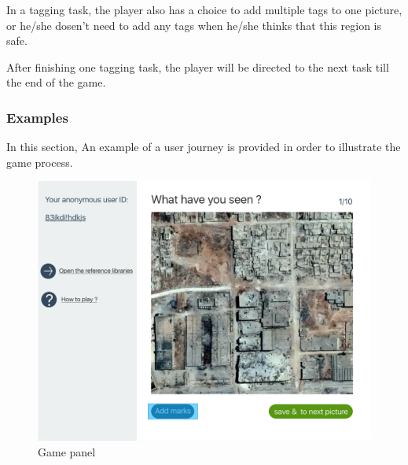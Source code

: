       In a tagging task,
      the player also has a choice to add multiple tags to one picture,
      or he/she dosen't need to add any tags when he/she thinks that this region is safe.

      After finishing one tagging task, 
      the player will be directed to the next task till the end of the game.


      \subsubsection{Examples}
      In this section,
      An example of a user journey is provided in order to illustrate the game process.

      \noindent\begin{minipage}{.45\textwidth}
      \begin{figure}[H]
      \centering
      \includegraphics[width=\textwidth]{figures/function-player-0}
      \caption{Game panel}
      \label{fig:player0}
      \end{figure}
      \end{minipage}\hfill
